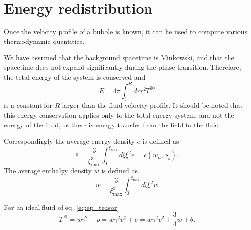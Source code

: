 \section{Energy redistribution}
\label{energy_redistribution}
Once the velocity profile of a bubble is known, it can be used to compute various thermodynamic quantities.

We have assumed that the background spacetime is Minkowski, and that the spacetime does not expand significantly during the phase transition.
Therefore, the total energy of the system is conserved and
\begin{equation}
E = 4 \pi \int_0^R dr r^2 T^{00}
\end{equation}
is a constant for $R$ larger than the fluid velocity profile.
It should be noted that this energy conservation applies only to the total energy system,
and not the energy of the fluid, as there is energy transfer from the field to the fluid.
\cite[p. 21]{lecture_notes}

Correspondingly the average energy density $\bar{e}$ is defined as \cite[p. 39]{lecture_notes}
\begin{equation}
\bar{e} = \frac{3}{\xi_\text{max}^3} \int_0^{\xi_\text{max}} d\xi \xi^2 e = e(w_n, \phi_s).
\label{eq:e_conservation}
\end{equation}
The average enthalpy density $\bar{w}$ is defined as
\begin{equation}
\bar{w} = \frac{3}{\xi_\text{max}^3} \int_0^{\xi_\text{max}} d\xi \xi^2 w
\end{equation}

For an ideal fluid of eq. \eqref{eq:ep_tensor} \cite[eq. B.23]{hindmarsh_gw_pt_2019}
\begin{equation}
T^{00} = w\gamma^2 - p = w\gamma^2 v^2 + e = w\gamma^2 v^2 + \frac{3}{4}w + \theta.
\end{equation}

